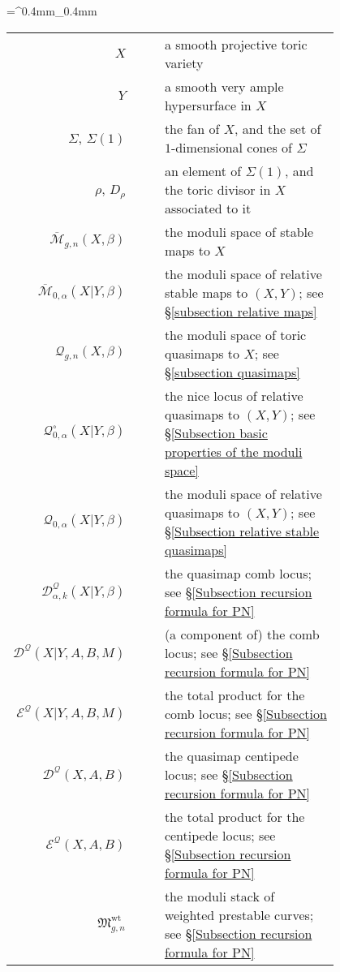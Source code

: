 \documentclass[10pt]{amsart}
\newcommand{\M}[4]{\overline{\mathcal{M}}_{#1,#2}(#3,#4)}
\newcommand{\Q}[4]{\mathcal{Q}_{#1,#2}(#3,#4)}
\newcommand{\MM}{\mathfrak M}
\theoremstyle{definition}
\theoremstyle{definition}
\begin{document}
\tabulinesep=^0.4mm_0.4mm
\begin{tabu}{r c c p{0.8\linewidth}}
$X$ & & & a smooth projective toric variety \\
$Y$ & & & a smooth very ample hypersurface in $X$ \\
$\Sigma$, $\Sigma(1)$ & & & the fan of $X$, and the set of $1$-dimensional cones of $\Sigma$ \\
$\rho$, $D_\rho$ & & & an element of $\Sigma(1)$, and the toric divisor in $X$ associated to it \\
$\M{g}{n}{X}{\beta}$ & & & the moduli space of stable maps to $X$ \\
$\M{0}{\alpha}{X|Y}{\beta}$ & & & the moduli space of relative stable maps to $(X,Y)$; see \S \ref{subsection relative maps} \\
$\Q{g}{n}{X}{\beta}$ & & & the moduli space of toric quasimaps to $X$; see \S \ref{subsection quasimaps} \\
$\mathcal{Q}^{\circ}_{0,\alpha}(X|Y,\beta)$ & & & the nice locus of relative quasimaps to $(X,Y)$; see \S \ref{Subsection basic properties of the moduli space} \\
$\Q{0}{\alpha}{X|Y}{\beta}$ & & & the moduli space of relative quasimaps to $(X,Y)$; see \S \ref{Subsection relative stable quasimaps} \\
$\mathcal{D}^{\mathcal{Q}}_{\alpha,k}(X|Y,\beta)$ & & & the quasimap comb locus; see \S \ref{Subsection recursion formula for PN} \\
$\mathcal{D}^{\mathcal{Q}}(X|Y,A,B,M)$ & & & (a component of) the comb locus; see \S \ref{Subsection recursion formula for PN} \\
$\mathcal{E}^{\mathcal{Q}}(X|Y,A,B,M)$ & & & the total product for the comb locus; see \S \ref{Subsection recursion formula for PN} \\
$\mathcal{D}^{\mathcal{Q}}(X,A,B)$ & & & the quasimap centipede locus; see \S \ref{Subsection recursion formula for PN} \\
$\mathcal{E}^{\mathcal{Q}}(X,A,B)$ & & & the total product for the centipede locus; see \S \ref{Subsection recursion formula for PN} \\
$\MM^{\operatorname{wt}}_{g,n}$ & & & the moduli stack of weighted prestable curves; see \S \ref{Subsection recursion formula for PN} \\

\end{tabu}
\end{document}
